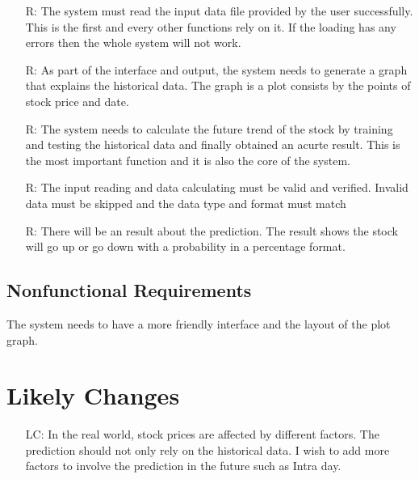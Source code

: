 \documentclass[12pt]{article}
\newcounter{reqnum} %
\newcounter{lcnum} %
\begin{document}
\noindent \begin{itemize}

\item[R\refstepcounter{reqnum}\thereqnum \label{R_Inputs}:] The system must read the input data file provided by the user successfully. This is the first and every other functions rely on it. If the loading has any errors then the whole system will not work. 

\item[R\refstepcounter{reqnum}\thereqnum \label{R_OutputInputs}:] As part of the interface and output, the system needs to generate a graph that explains  the historical data. The graph is a plot consists by the points of stock price and date.  


\item[R\refstepcounter{reqnum}\thereqnum \label{R_Calculate}:] The system needs to calculate the future trend of the stock by training and testing the historical data and finally obtained an acurte result. This is the most important function and it is also the core of the system.

\item[R\refstepcounter{reqnum}\thereqnum \label{R_VerifyOutput}:] The input reading and data calculating must be valid and verified. Invalid data must be skipped and the data type and format must match

\item[R\refstepcounter{reqnum}\thereqnum \label{R_Output}:]  There will be an result about the prediction. The result shows the stock will go up or go down with a probability in a percentage format.
\end{itemize}

\subsection{Nonfunctional Requirements}

The system needs to have a more friendly interface and the layout of the plot graph.

\section{Likely Changes}    

\noindent \begin{itemize}

\item[LC\refstepcounter{lcnum}\thelcnum\label{LC1}:] In the real world, stock prices are affected by different factors. The prediction should not only rely on the historical data. I wish to add more factors to involve the prediction in the future such as Intra day.

\end{itemize}
\end{document}
